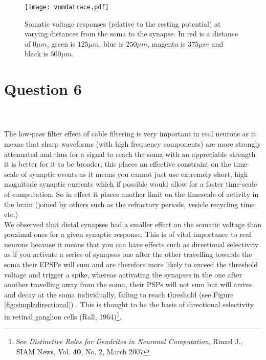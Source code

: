 \documentclass[paper=a4, fontsize=11pt]{scrartcl} %
\numberwithin{equation}{section} %
\numberwithin{figure}{section} %
\numberwithin{table}{section} %
\begin{document}
\begin{figure}[!h]
\centering
\texttt{[image: vnmdatrace.pdf]}
  \caption{Somatic voltage responses (relative to the resting potential) at varying distances from the soma to the synapse. In red is a distance of $0\mu m$, green is $125\mu m$, blue is $250\mu m$, magenta is $375\mu m$ and black is $500\mu m$. }
  \label{fig:vnmdatrace}
\end{figure}



\newpage
\section{\textbf{Question 6}}
\\
\\
The low-pass filter effect of cable filtering is very important in real neurons as it means that sharp waveforms (with high frequency components) are more strongly attenuated and thus for a signal to reach the soma with an appreciable strength it is better for it to be broader, this places an effective constraint on the time-scale of synaptic events as it means you cannot just use extremely short, high magnitude synaptic currents which if possible would allow for a faster time-scale of computation. So in effect it places another limit on the timescale of activity in the brain (joined by others such as the refractory periods, vesicle recycling time etc.)\\


We observed that distal synapses had a smaller effect on the somatic voltage than proximal ones for a given synaptic response. This is of vital importance to real neurons because it means that you can have effects such as directional selectivity as if you activate a series of synapses one after the other travelling towards the soma their EPSPs will sum and are therefore more likely to exceed the threshold voltage and trigger a spike, whereas activating the synapses in the one after another travelling away from the soma, their PSPs will not sum but will arrive and decay at the soma individually, failing to reach threshold (see Figure \ref{fig:simpledirectional}) . This is thought to be the basis of directional selectivity in retinal ganglion cells (Rall, 1964)\footnote{See \textit{Distinctive Roles for Dendrites in Neuronal
Computation}, Rinzel J., SIAM News, Vol. \textbf{40}, No. 2, March 2007}.\\
\end{document}
